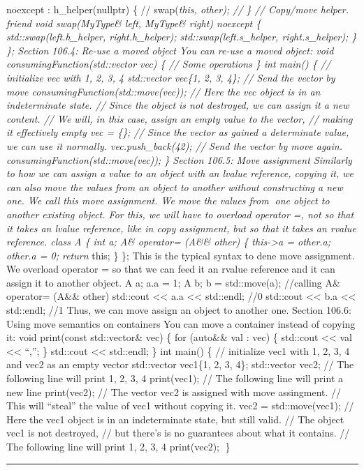 noexcept : h\_helper(nullptr) \{ // swap(\emph{this, other); // \} //
Copy/move helper. friend void swap(MyType\& left, MyType\& right)
noexcept \{ std::swap(left.h\_helper, right.h\_helper);
std::swap(left.s\_helper, right.s\_helper); \} \}; Section 106.4: Re-use
a moved object You can re-use a moved object: void
consumingFunction(std::vector vec) \{ // Some operations \} int main()
\{ // initialize vec with 1, 2, 3, 4 std::vector vec\{1, 2, 3, 4\}; //
Send the vector by move consumingFunction(std::move(vec)); // Here the
vec object is in an indeterminate state. // Since the object is not
destroyed, we can assign it a new content. // We will, in this case,
assign an empty value to the vector, // making it effectively empty vec
= \{\}; // Since the vector as gained a determinate value, we can use it
normally. vec.push\_back(42); // Send the vector by move again.
consumingFunction(std::move(vec)); \} Section 106.5: Move assignment
Similarly to how we can assign a value to an object with an lvalue
reference, copying it, we can also move the values from an object to
another without constructing a new one. We call this move assignment. We
move the values from one object to another existing object. For this,
we will have to overload operator =, not so that it takes an lvalue
reference, like in copy assignment, but so that it takes an rvalue
reference. class A \{ int a; A\& operator= (A\&\& other) \{
this-\textgreater a = other.a; other.a = 0; return }this; \} \}; This is
the typical syntax to dene move assignment. We overload operator = so
that we can feed it an rvalue reference and it can assign it to another
object. A a; a.a = 1; A b; b = std::move(a); //calling A\& operator=
(A\&\& other) std::cout \textless\textless{} a.a \textless\textless{}
std::endl; //0 std::cout \textless\textless{} b.a \textless\textless{}
std::endl; //1 Thus, we can move assign an object to another one.
Section 106.6: Using move semantics on containers You can move a
container instead of copying it: void print(const std::vector\& vec) \{
for (auto\&\& val : vec) \{ std::cout \textless\textless{} val
\textless\textless{} ``,''; \} std::cout \textless\textless{} std::endl;
\} int main() \{ // initialize vec1 with 1, 2, 3, 4 and vec2 as an empty
vector std::vector vec1\{1, 2, 3, 4\}; std::vector vec2; // The
following line will print 1, 2, 3, 4 print(vec1); // The following line
will print a new line print(vec2); // The vector vec2 is assigned with
move assingment. // This will ``steal'' the value of vec1 without
copying it. vec2 = std::move(vec1); // Here the vec1 object is in an
indeterminate state, but still valid. // The object vec1 is not
destroyed, // but there's is no guarantees about what it contains. //
The following line will print 1, 2, 3, 4 print(vec2); \}

\begin{center}\rule{0.5\linewidth}{0.5pt}\end{center}
